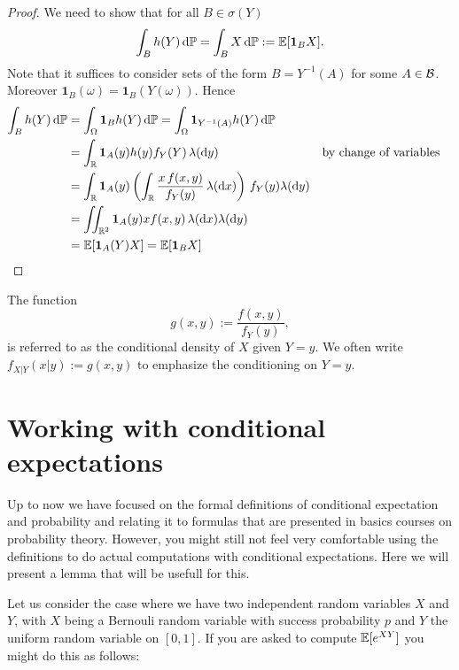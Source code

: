 \begin{proof}
We need to show that for all $B \in \sigma(Y)$
\[
	\int_B h(Y) \, \mathrm{d} \mathbb P = \int_B X \, \mathrm{d} \mathbb P := \mathbb E[\mathbf{1}_B X]. 
\]
Note that it suffices to consider sets of the form $B = Y^{-1}(A)$ for some $A \in \mathcal B$. Moreover $\mathbf{1}_B(\omega) = \mathbf{1}_B(Y(\omega))$. Hence
\begin{align*}
	\int_B h(Y) \, \mathrm{d} \mathbb P &= \int_\Omega \mathbf{1}_{B} h(Y) \, \mathrm{d} \mathbb P 
	= \int_\Omega \mathbf{1}_{Y^{-1}(A)} h(Y) \, \mathrm{d} \mathbb P \\
	&= \int_{\mathbb R} \mathbf{1}_{A}(y) h(y) f_Y(Y) \, \lambda (\mathrm{d} y) &&\text{by change of variables}\\
	&= \int_{\mathbb R} \mathbf{1}_A(y) \left(\int_{\mathbb R} \frac{x \, f(x,y)}{f_Y(y)} \, \lambda(\mathrm{d} x)\right)
		\, f_Y(y) \lambda(\mathrm{d} y)\\
	&= \iint_{\mathbb R^2} \mathbf{1}_A(y) x f(x,y) \, \lambda(\mathrm{d} x) \lambda(\mathrm{d} y)\\
	&= \mathbb E[\mathbf{1}_A(Y) X] = \mathbb E[\mathbf{1}_B X] \qedhere
\end{align*}
\end{proof}

The function
\begin{equation}
	g(x,y) := \frac{f(x,y)}{f_Y(y)},
\end{equation}
is referred to as the conditional density of $X$ given $Y = y$. We often write $f_{X|Y}(x|y) := g(x,y)$ to emphasize the conditioning on $Y = y$.



\section{Working with conditional expectations}

Up to now we have focused on the formal definitions of conditional expectation and probability and relating it to formulas that are presented in basics courses on probability theory. However, you might still not feel very comfortable using the definitions to do actual computations with conditional expectations. Here we will present a lemma that will be usefull for this.

Let us consider the case where we have two independent random variables $X$ and $Y$, with $X$ being a Bernouli random variable with success probability $p$ and $Y$ the uniform random variable on $[0,1]$. If you are asked to compute $\mathbb E[e^{XY}]$ you might do this as follows:

